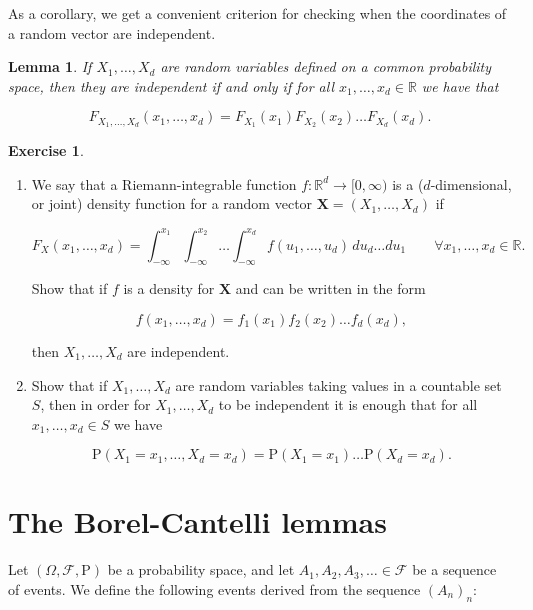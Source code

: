 \documentclass[11pt]{report}
\providecommand{\cal}{\mathcal}
\newcommand{\R}{\mathbb{R}}
\theoremstyle{plain}
\newtheorem{lem}[thm]{Lemma}
\theoremstyle{definition}
\newtheorem{xexercise}[thm]{Exercise}
\begin{document}
\noindent As a corollary, we get a convenient criterion for
checking when the coordinates of a random vector are
independent.

\begin{lem}
If $X_1,\ldots,X_d$ are random variables defined on a
common probability space, then they are independent if
and only if for all $x_1,\ldots,x_d \in \R$ we have
that

\[
F_{X_1,\ldots,X_d}(x_1,\ldots,x_d) = F_{X_1}(x_1) F_{X_2}(x_2) \ldots F_{X_d}(x_d).
\]

\end{lem}

\begin{xexercise}

\begin{enumerate}[label=(\roman*)]
\item We say that a Riemann-integrable function
$f:\R^d\to[0,\infty)$ is a ($d$-dimensional, or
joint) density function for a random vector
$\mathbf{X}=(X_1,\ldots,X_d)$ if

\[
F_X(x_1,\ldots,x_d) = \int_{-\infty}^{x_1} \int_{-\infty}^{x_2} \ldots \int_{-\infty}^{x_d}
f(u_1,\ldots,u_d)\,du_d\ldots du_1 \qquad \forall x_1,\ldots,x_d \in \R.
\]

\noindent Show that if $f$ is a density for $\mathbf{X}$ and
can be written in the form

\[
f(x_1,\ldots,x_d) = f_1(x_1) f_2(x_2) \ldots f_d(x_d),
\]

\noindent then $X_1,\ldots,X_d$ are independent.

\item Show that if $X_1,\ldots,X_d$ are random variables
taking values in a countable set $S$, then in order
for $X_1,\ldots,X_d$ to be independent it is enough
that for all $x_1,\ldots,x_d\in S$ we have

\[
\mathrm{P}(X_1=x_1,\ldots,X_d = x_d) = \mathrm{P}(X_1=x_1)\ldots \mathrm{P}(X_d=x_d).
\]
\end{enumerate}

\end{xexercise}

\chapter{The Borel-Cantelli lemmas}

Let $(\Omega, {\cal F}, \mathrm{P})$ be a probability
space, and let $A_1, A_2, A_3, \ldots \in {\cal F}$
be a sequence of events. We define the following
events derived from the sequence $(A_n)_n$:
\end{document}
